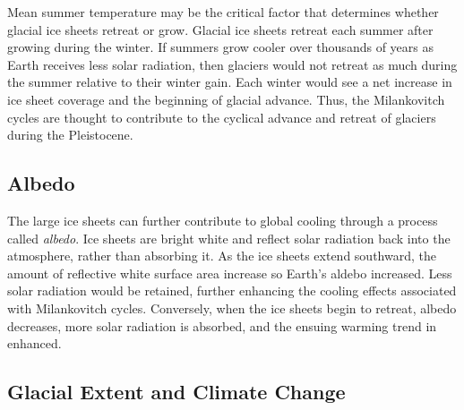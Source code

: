\documentclass{tufte-handout}
\begin{document}
Mean summer temperature may be the critical factor that determines whether glacial ice sheets retreat or grow.  Glacial ice sheets retreat each summer after growing during the winter.  If summers grow cooler over thousands of years as Earth receives less solar radiation, then glaciers would not retreat as much during the summer relative to their winter gain. Each winter would see a net increase in ice sheet coverage and the beginning of glacial advance.  Thus, the Milankovitch cycles are thought to contribute to the cyclical advance and retreat of glaciers during the Pleistocene.

\subsection{Albedo}\label{sec:albedo}

The large ice sheets can further contribute to global cooling through a process called \textit{albedo}. Ice sheets are bright white and reflect solar radiation back into the atmosphere, rather than absorbing it.  As the ice sheets extend southward, the amount of reflective white surface area increase so Earth's aldebo increased.  Less solar radiation would be retained, further enhancing the cooling effects associated with Milankovitch cycles. Conversely, when the ice sheets begin to retreat, albedo decreases, more solar radiation is absorbed, and the ensuing warming trend in enhanced.

\subsection{Glacial Extent and Climate Change}\label{sec:glaciationextent}
\end{document}
